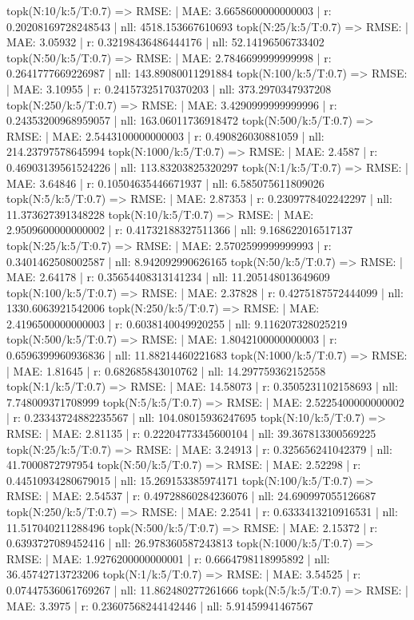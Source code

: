 topk(N:10/k:5/T:0.7) => RMSE: | MAE: 3.6658600000000003 | r: 0.20208169728248543 | nll: 4518.153667610693
topk(N:25/k:5/T:0.7) => RMSE: | MAE: 3.05932 | r: 0.32198436486444176 | nll: 52.14196506733402
topk(N:50/k:5/T:0.7) => RMSE: | MAE: 2.7846699999999998 | r: 0.2641777669226987 | nll: 143.89080011291884
topk(N:100/k:5/T:0.7) => RMSE: | MAE: 3.10955 | r: 0.24157325170370203 | nll: 373.2970347937208
topk(N:250/k:5/T:0.7) => RMSE: | MAE: 3.4290999999999996 | r: 0.24353200968959057 | nll: 163.06011736918472
topk(N:500/k:5/T:0.7) => RMSE: | MAE: 2.5443100000000003 | r: 0.490826030881059 | nll: 214.23797578645994
topk(N:1000/k:5/T:0.7) => RMSE: | MAE: 2.4587 | r: 0.46903139561524226 | nll: 113.83203825320297
topk(N:1/k:5/T:0.7) => RMSE: | MAE: 3.64846 | r: 0.10504635446671937 | nll: 6.585075611809026
topk(N:5/k:5/T:0.7) => RMSE: | MAE: 2.87353 | r: 0.2309778402242297 | nll: 11.373627391348228
topk(N:10/k:5/T:0.7) => RMSE: | MAE: 2.9509600000000002 | r: 0.41732188327511366 | nll: 9.168622016517137
topk(N:25/k:5/T:0.7) => RMSE: | MAE: 2.5702599999999993 | r: 0.3401462508002587 | nll: 8.942092990626165
topk(N:50/k:5/T:0.7) => RMSE: | MAE: 2.64178 | r: 0.35654408313141234 | nll: 11.205148013649609
topk(N:100/k:5/T:0.7) => RMSE: | MAE: 2.37828 | r: 0.4275187572444099 | nll: 1330.6063921542006
topk(N:250/k:5/T:0.7) => RMSE: | MAE: 2.4196500000000003 | r: 0.6038140049920255 | nll: 9.116207328025219
topk(N:500/k:5/T:0.7) => RMSE: | MAE: 1.8042100000000003 | r: 0.6596399960936836 | nll: 11.88214460221683
topk(N:1000/k:5/T:0.7) => RMSE: | MAE: 1.81645 | r: 0.682685843010762 | nll: 14.297759362152558
topk(N:1/k:5/T:0.7) => RMSE: | MAE: 14.58073 | r: 0.3505231102158693 | nll: 7.748009371708999
topk(N:5/k:5/T:0.7) => RMSE: | MAE: 2.5225400000000002 | r: 0.23343724882235567 | nll: 104.08015936247695
topk(N:10/k:5/T:0.7) => RMSE: | MAE: 2.81135 | r: 0.22204773345600104 | nll: 39.367813300569225
topk(N:25/k:5/T:0.7) => RMSE: | MAE: 3.24913 | r: 0.325656241042379 | nll: 41.7000872797954
topk(N:50/k:5/T:0.7) => RMSE: | MAE: 2.52298 | r: 0.44510934280679015 | nll: 15.269153385974171
topk(N:100/k:5/T:0.7) => RMSE: | MAE: 2.54537 | r: 0.49728860284236076 | nll: 24.690997055126687
topk(N:250/k:5/T:0.7) => RMSE: | MAE: 2.2541 | r: 0.6333413210916531 | nll: 11.517040211288496
topk(N:500/k:5/T:0.7) => RMSE: | MAE: 2.15372 | r: 0.6393727089452416 | nll: 26.978360587243813
topk(N:1000/k:5/T:0.7) => RMSE: | MAE: 1.9276200000000001 | r: 0.6664798118995892 | nll: 36.45742713723206
topk(N:1/k:5/T:0.7) => RMSE: | MAE: 3.54525 | r: 0.07447536061769267 | nll: 11.862480277261666
topk(N:5/k:5/T:0.7) => RMSE: | MAE: 3.3975 | r: 0.23607568244142446 | nll: 5.91459941467567
